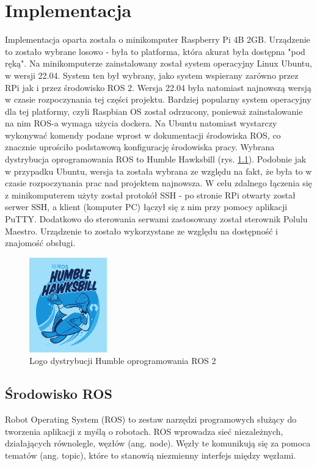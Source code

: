 \chapter{Implementacja}
Implementacja oparta została o minikomputer Raspberry Pi 4B 2GB. Urządzenie to zostało wybrane losowo - była to platforma, która akurat była dostępna "pod ręką". Na minikomputerze zainstalowany został system operacyjny Linux Ubuntu, w wersji 22.04. System ten był wybrany, jako system wspierany zarówno przez RPi jak i przez środowisko ROS 2. Wersja 22.04 była natomiast najnowszą wersją w czasie rozpoczynania tej części projektu. Bardziej popularny system operacyjny dla tej platformy, czyli Raspbian OS został odrzucony, ponieważ zainstalowanie na nim ROS-a wymaga użycia dockera. Na Ubuntu natomiast wystarczy wykonywać komendy podane wprost w dokumentacji środowiska ROS, co znacznie uprościło podstawową konfigurację środowiska pracy. Wybrana dystrybucja oprogramowania ROS to Humble Hawksbill (rys. \ref{humble_logo}). Podobnie jak w przypadku Ubuntu, wersja ta została wybrana ze względu na fakt, że była to w czasie rozpoczynania prac nad projektem najnowsza. W celu zdalnego łączenia się z minikomputerem użyty został protokół SSH - po stronie RPi otwarty został serwer SSH, a klient (komputer PC) łączył się z nim przy pomocy aplikacji PuTTY. Dodatkowo do sterowania serwami zastosowany został sterownik Polulu Maestro. Urządzenie to zostało wykorzystane ze względu na dostępność i znajomość obsługi.

\begin{figure}[h!]
\includegraphics[width=0.3\textwidth]{img/HumbleHawksbill.png}
\centering
\caption{Logo dystrybucji Humble oprogramowania ROS 2 \cite{ROS_docs}}
\label{humble_logo}
\end{figure}

\section{Środowisko ROS \cite{ROS_docs}}
Robot Operating System (ROS) to zestaw narzędzi programowych służący do tworzenia aplikacji z myślą o robotach. ROS wprowadza sieć niezależnych, działających równolegle, węzłów (ang. node). Węzły te komunikują się za pomoca tematów (ang. topic), które to stanowią niezmienny interfejs między węzłami.\\




